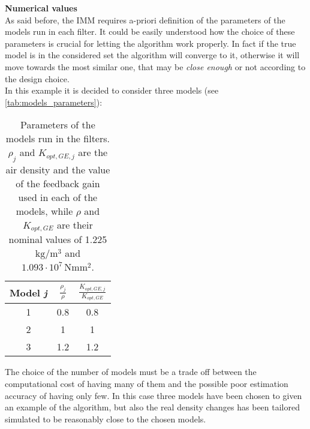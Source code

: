 \textbf{Numerical values}\\
As said before, the IMM requires a-priori definition of the parameters of the models run in each filter. It could be easily understood how the choice of these parameters is crucial for letting the algorithm work properly. In fact if the true model is in the considered set the algorithm will converge to it, otherwise it will move towards the most similar one, that may be \textit{close enough} or not according to the design choice.\\
In this example it is decided to consider three models (see \autoref{tab:models_parameters}):
\begin{table}
  \centering
  \caption{Parameters of the models run in the filters. $\rho_j$ and $K_{opt,GE,j}$ are the air density and the value of the feedback gain used in each of the models, while $\rho$ and $K_{opt,GE}$ are their nominal values of 1.225 $\si{\kilo\gram\per\cubic\meter}$ and $1.093\cdot10^{7} \, \si{\newton\meter\square\meter}$.}
  \begin{tabular}{ccc}
    \toprule
    Model \textit{j} & $\frac{\rho_j}{\rho}$ & $\frac{K_{opt,GE,j}}{K_{opt,GE}}$  \\
    \midrule
    1 & 0.8 & 0.8\\
    2 & 1 & 1\\
    3 & 1.2 & 1.2\\
    \bottomrule
  \end{tabular}
  \label{tab:models_parameters}
\end{table}
The choice of the number of models must be a trade off between the computational cost of having many of them and the possible poor estimation accuracy of having only few. In this case three models have been chosen to given an example of the algorithm, but also the real density changes has been tailored simulated to be reasonably close to the chosen models.  

